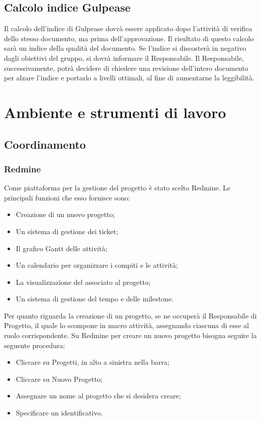 \subsection{Calcolo indice Gulpease}
Il calcolo dell'indice di Gulpease dovrà essere applicato dopo l'attività di verifica dello stesso documento, ma prima dell'approvazione. Il risultato di questo calcolo sarà un indice della qualità del documento. Se l'indice si discosterà in negativo dagli obiettivi del gruppo, si dovrà informare il Responsabile. Il Responsabile, successivamente, potrà decidere di chiedere una revisione dell'intero documento per alzare l'indice e portarlo a livelli ottimali, al fine di aumentarne la leggibilità.


\newpage
\section{Ambiente e strumenti di lavoro}
\label{4.0}

\subsection{Coordinamento}
\label{}

\subsubsection{Redmine}
\label{4.1}
Come piattaforma per la gestione del progetto è stato scelto Redmine. Le principali funzioni che esso fornisce sono:
\begin{itemize}
\item Creazione di un nuovo progetto;
\item Un sistema di gestione dei ticket;
\item Il grafico Gantt delle attività;
\item Un calendario per organizzare i compiti e le attività;
\item La visualizzazione del  associato al progetto;
\item Un sistema di  gestione del tempo e delle milestone.
\end{itemize}
Per quanto riguarda la creazione di un progetto, se ne occuperà il Responsabile di Progetto, il quale lo scompone in macro attività, assegnando ciascuna di esse al ruolo corrispondente.
Su Redmine per creare un nuovo progetto bisogna seguire la seguente procedura:
\begin{itemize}
\item Cliccare su Progetti, in alto a sinistra nella barra;
\item Cliccare su Nuovo Progetto;
\item Assegnare un nome al progetto che si desidera creare;
\item Specificare un identificativo.
\end{itemize}
